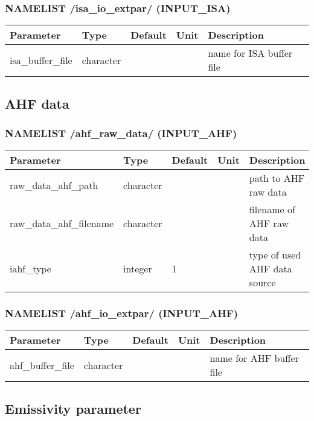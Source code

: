 \documentclass[a4paper,10pt,DIV14,BCOR1cm,titlepage,twoside]{scrartcl}
\providecommand{\tabularnewline}{\\}
\begin{document}
\subsubsection*{NAMELIST /isa\_io\_extpar/ (INPUT\_ISA)}
\begin{longtable}{|p{4cm}|p{1.5cm}|p{1.5cm}|p{1cm}|p{6cm}|}
\hline 
\textbf{Parameter}& \textbf{Type}& \textbf{Default}& \textbf{Unit}& \textbf{Description}
\tabularnewline
\hline
\endhead
\hline
isa\_buffer\_file & character & &  & name for ISA buffer file
\tabularnewline
\hline 
\bottomrule
\end{longtable}

\subsection{AHF data}\label{namelist_input_for_extpar_ahf}

\subsubsection*{NAMELIST /ahf\_raw\_data/ (INPUT\_AHF)}

\begin{longtable}{|p{4cm}|p{1.5cm}|p{1.5cm}|p{1cm}|p{6cm}|}
\hline 
\textbf{Parameter}& \textbf{Type}& \textbf{Default}& \textbf{Unit}& \textbf{Description}
\tabularnewline
\hline
\endhead
\hline 
raw\_data\_ahf\_path & character & &  & path to AHF raw data \tabularnewline
\hline 
raw\_data\_ahf\_filename & character & &  & filename of AHF raw data \tabularnewline
\hline
iahf\_type & integer & 1 &  & type of used AHF data source \tabularnewline
\hline
\bottomrule
\end{longtable}

\subsubsection*{NAMELIST /ahf\_io\_extpar/ (INPUT\_AHF)}
\begin{longtable}{|p{4cm}|p{1.5cm}|p{1.5cm}|p{1cm}|p{6cm}|}
\hline 
\textbf{Parameter}& \textbf{Type}& \textbf{Default}& \textbf{Unit}& \textbf{Description}
\tabularnewline
\hline
\endhead
\hline
ahf\_buffer\_file & character & &  & name for AHF buffer file
\tabularnewline
\hline 
\bottomrule
\end{longtable}


\subsection{Emissivity parameter}\label{namelist_input_for_extpar_emissivity}
\end{document}

